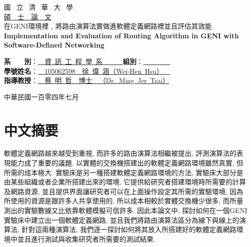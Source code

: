 \documentclass[a4paper,12pt]{report}
\begin{document}
  \begin{CJK*}{UTF8}{bkai}
  
  \begin{titlepage}
  \begin{center}
  {\fontsize{28}{28}國~  立~  清~  華~  大~  學}\\

\vspace{1.5cm}
\Huge{\underline{碩　士　論　文}}\\
\vspace{0.8cm}
\vspace{2.4cm} \Large{在GENI環境裡﹐將路由演算法實做進軟體定義網路裡並且評估其效能
}\\
\vspace{0.5cm} \Large{\bf Implementation and Evaluation of Routing Algorithm in GENI with Software-Defined Networking\\}
\vspace{2cm}
\parbox[t]{14cm}{
{\bf 系　　別}：\underline{　資~訊~工~程~學~系　　~~}{\bf 組別}：\underline{　　　~~}\\
{\bf 學號姓名}：\underline{　105062598　徐~偉~涵（Wei-Hen~Hsu）~~}\\
{\bf 指導教授}：\underline{　蔡~明~哲　博士~~（Dr.~Ming~Jer~Tsai）}\\
}
\vspace{0cm}
中華民國一百零四年七月\\
\clearpage
  \end{center}
  \end{titlepage}

  \chapter*{中文摘要}
  \qquad 軟體定義網路越來越受到重視, 而許多的路由演算法相繼被提出, 評測演算法的表現能力成了重要的議題. 以實體的交換機搭建出的軟體定義網路環境雖然真實, 但所需的成本極大. 實驗床是另一種搭建軟體定義網路環境的方法, 實驗床大部分是由某些組織或者企業所搭建出來的環境, 它提供給研究者搭建環境時所需要的計算及網路資源, 並且提供界面讓研究者可以在上面操作設定其所需的實驗環境, 因為所使用的資源是跟許多人共享使用的, 所以成本相較於實體交換機少很多, 而所量測出的實驗數據又比依靠軟體模擬可信許多. 
\newline\null\qquad 因此本論文中, 探討如何在一個GENI實驗床中建立出一個軟體定義網路, 並且我們將路由演算法區分為線下與線上的演算法, 針對這兩種演算法, 我們逐一探討如何將其放入所搭建好的軟體定義網路環境中並且進行測試與收集研究者所需要的測試結果.
  \clearpage

\end{CJK*}
\end{document}
